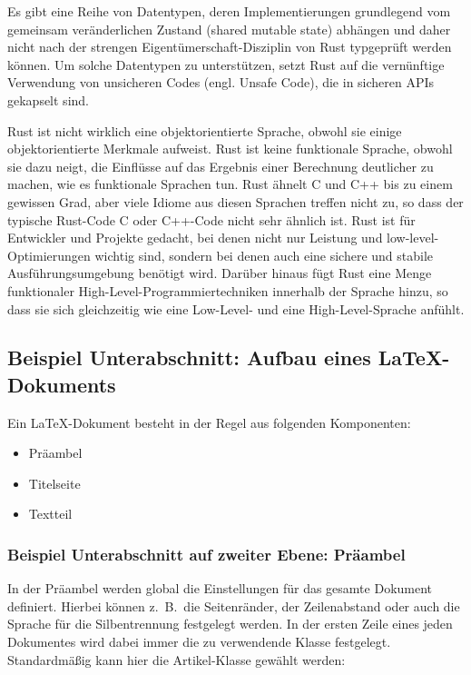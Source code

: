 Es gibt eine Reihe von Datentypen, deren Implementierungen grundlegend vom gemeinsam veränderlichen Zustand (shared mutable state) abhängen und daher nicht nach der strengen Eigentümerschaft-Disziplin von Rust typgeprüft werden können. Um solche Datentypen zu unterstützen, setzt Rust auf die vernünftige Verwendung von unsicheren Codes (engl. Unsafe Code), die in sicheren APIs gekapselt sind.





Rust ist nicht wirklich eine objektorientierte Sprache, obwohl sie einige objektorientierte Merkmale aufweist. Rust ist keine funktionale Sprache, obwohl sie dazu neigt, die Einflüsse auf das Ergebnis einer Berechnung deutlicher zu machen, wie es funktionale Sprachen tun. Rust ähnelt C und C++ bis zu einem gewissen Grad, aber viele Idiome aus diesen Sprachen treffen nicht zu, so dass der typische Rust-Code C oder C++-Code nicht sehr ähnlich ist.
Rust ist für Entwickler und Projekte gedacht, bei denen nicht nur Leistung und low-level-Optimierungen wichtig sind, sondern bei denen auch eine sichere und stabile Ausführungsumgebung benötigt wird. Darüber hinaus fügt Rust eine Menge funktionaler High-Level-Programmiertechniken innerhalb der Sprache hinzu, so dass sie sich gleichzeitig wie eine Low-Level- und eine High-Level-Sprache anfühlt.


\subsection{Beispiel Unterabschnitt: Aufbau eines \LaTeX-Dokuments}

Ein \LaTeX-Dokument besteht in der Regel aus folgenden Komponenten:
\begin{itemize}
	\item Pr\"aambel
	\item Titelseite
	\item Textteil
\end{itemize}

\subsubsection{Beispiel Unterabschnitt auf zweiter Ebene: Pr\"aambel}
In der Pr\"aambel werden global die Einstellungen f\"ur das gesamte Dokument definiert. Hierbei k\"onnen z.~B.~die Seitenr\"ander, 
der Zeilenabstand oder auch die Sprache f\"ur die Silbentrennung festgelegt werden. In der ersten Zeile eines jeden Dokumentes wird dabei
immer die zu verwendende Klasse festgelegt. Standardm\"aßig kann hier die Artikel-Klasse gew\"ahlt werden:


